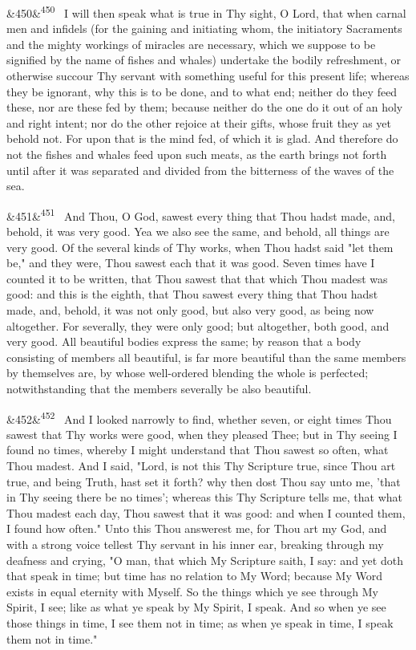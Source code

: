 \documentclass[12pt]{article}
\newcommand{\para}[1][]{\par\noindent\ifx&#1&\else\textsuperscript{\footnotesize #1}~\fi}
\begin{document}
\para[450] I will then speak what is true in Thy sight, O Lord, that when carnal men and infidels (for the gaining and initiating whom, the initiatory Sacraments and the mighty workings of miracles are necessary, which we suppose to be signified by the name of fishes and whales) undertake the bodily refreshment, or otherwise succour Thy servant with something useful for this present life; whereas they be ignorant, why this is to be done, and to what end; neither do they feed these, nor are these fed by them; because neither do the one do it out of an holy and right intent; nor do the other rejoice at their gifts, whose fruit they as yet behold not. For upon that is the mind fed, of which it is glad. And therefore do not the fishes and whales feed upon such meats, as the earth brings not forth until after it was separated and divided from the bitterness of the waves of the sea.

\para[451] And Thou, O God, sawest every thing that Thou hadst made, and, behold, it was very good. Yea we also see the same, and behold, all things are very good. Of the several kinds of Thy works, when Thou hadst said "let them be," and they were, Thou sawest each that it was good. Seven times have I counted it to be written, that Thou sawest that that which Thou madest was good: and this is the eighth, that Thou sawest every thing that Thou hadst made, and, behold, it was not only good, but also very good, as being now altogether. For severally, they were only good; but altogether, both good, and very good. All beautiful bodies express the same; by reason that a body consisting of members all beautiful, is far more beautiful than the same members by themselves are, by whose well-ordered blending the whole is perfected; notwithstanding that the members severally be also beautiful.

\para[452] And I looked narrowly to find, whether seven, or eight times Thou sawest that Thy works were good, when they pleased Thee; but in Thy seeing I found no times, whereby I might understand that Thou sawest so often, what Thou madest. And I said, "Lord, is not this Thy Scripture true, since Thou art true, and being Truth, hast set it forth? why then dost Thou say unto me, 'that in Thy seeing there be no times'; whereas this Thy Scripture tells me, that what Thou madest each day, Thou sawest that it was good: and when I counted them, I found how often." Unto this Thou answerest me, for Thou art my God, and with a strong voice tellest Thy servant in his inner ear, breaking through my deafness and crying, "O man, that which My Scripture saith, I say: and yet doth that speak in time; but time has no relation to My Word; because My Word exists in equal eternity with Myself. So the things which ye see through My Spirit, I see; like as what ye speak by My Spirit, I speak. And so when ye see those things in time, I see them not in time; as when ye speak in time, I speak them not in time."
\end{document}
